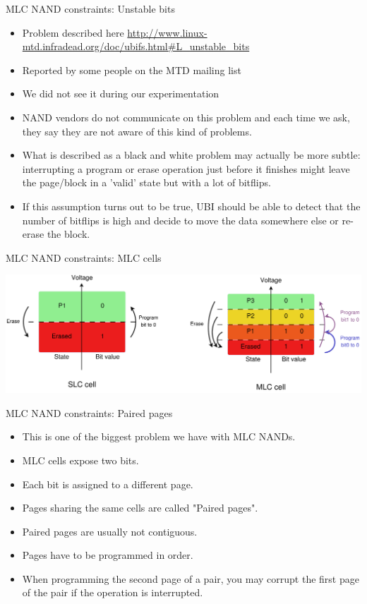 \documentclass[aspectratio=169,obeyspaces,spaces,hyphens,dvipsnames]{beamer}
\begin{document}
\begin{frame}{MLC NAND constraints: Unstable bits}
  \begin{itemize}
  \item Problem described here
	\url{http://www.linux-mtd.infradead.org/doc/ubifs.html\#L_unstable_bits}
  \item Reported by some people on the MTD mailing list
  \item We did not see it during our experimentation
  \item NAND vendors do not communicate on this problem and each
	time we ask, they say they are not aware of this kind of
	problems.
  \item What is described as a black and white problem may actually
	be more subtle: interrupting a program or erase operation
	just before it finishes might leave the page/block in a 'valid'
	state but with a lot of bitflips.
  \item If this assumption turns out to be true, UBI should be able to
	detect that the number of bitflips is high and decide to move
	the data somewhere else or re-erase the block.
  \end{itemize}
\end{frame}

\begin{frame}{MLC NAND constraints: MLC cells}
  \begin{center}
    \includegraphics[scale=0.2]{slc-mlc-cell.pdf}
  \end{center}
\end{frame}

\begin{frame}{MLC NAND constraints: Paired pages}
  \begin{itemize}
  \item This is one of the biggest problem we have with MLC NANDs.
  \item MLC cells expose two bits.
  \item Each bit is assigned to a different page.
  \item Pages sharing the same cells are called "Paired pages".
  \item Paired pages are usually not contiguous.
  \item Pages have to be programmed in order.
  \item When programming the second page of a pair, you may corrupt
	the first page of the pair if the operation is interrupted.
  \end{itemize}
\end{frame}
\end{document}
